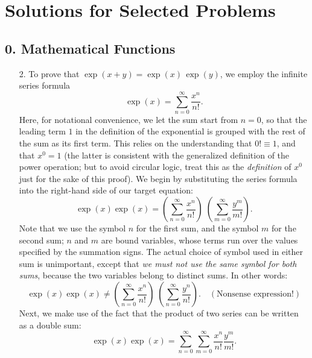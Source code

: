 \documentclass[10pt,a4paper]{article}
\begin{document}
\setcounter{page}{94}

\section{Solutions for Selected Problems}

\subsection*{0. Mathematical Functions}

\begin{enumerate}
\item[2.]
To prove that $\exp(x+y) = \exp(x)\,\exp(y)$, we employ the infinite
series formula \begin{equation}
  \exp(x) = \sum_{n=0}^\infty\frac{x^n}{n!}.
\end{equation}
Here, for notational convenience, we let the sum start from $n = 0$,
so that the leading term $1$ in the definition of the exponential is
grouped with the rest of the sum as its first term. This relies on the
understanding that $0! \equiv 1$, and that $x^0 = 1$ (the latter is
consistent with the generalized definition of the power operation; but
to avoid circular logic, treat this as the \emph{definition} of $x^0$
just for the sake of this proof). We begin by substituting the series
formula into the right-hand side of our target equation:
\begin{equation}
  \exp(x)\exp(x) = \left(\sum_{n=0}^\infty\frac{x^n}{n!}\right)\;\left(\sum_{m=0}^\infty\frac{y^m}{m!}\right).
\end{equation}
Note that we use the symbol $n$ for the first sum, and the symbol
$m$ for the second sum; $n$ and $m$ are bound variables, whose
terms run over the values specified by the summation signs. The actual
choice of symbol used in either sum is unimportant, except that \emph{we
must not use the same symbol for both sums}, because the two variables
belong to distinct sums. In other words:
\begin{equation*}
  \exp(x)\exp(x) \ne \left(\sum_{n=0}^\infty\frac{x^n}{n!}\right)\;\left(\sum_{n=0}^\infty\frac{y^n}{n!}\right). \quad(\text{Nonsense expression!})
\end{equation*}
Next, we make use of the fact that the product of two series can be
written as a double sum:
\begin{equation}
  \exp(x)\exp(x) = \sum_{n=0}^\infty \sum_{m=0}^\infty \frac{x^n}{n!} \frac{y^m}{m!}.
\end{equation}

\end{enumerate}
\end{document}
